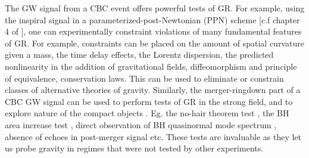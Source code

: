 The GW signal from a CBC event offers powerful tests of GR. For example, using the inspiral signal in a parameterized-post-Newtonian (PPN) scheme [c.f chapter 4 of \cite{CliffWills_book}], one can experimentally constraint violations of many fundamental features of GR. For example, constraints can be placed on the amount of spatial curvature given a mass, the time delay effects, the Lorentz dispersion, the predicted nonlinearity in the addition of gravitational fields, diffeomorphism and principle of equivalence, conservation laws. This can be used to eliminate or constrain classes of alternative theories of gravity. Similarly, the merger-ringdown part of a CBC GW signal can be used to perform tests of GR in the strong field, and to explore nature of the compact objects \cite{Mazur:2000pn,misner1973gravitation,Dreyer,Gossan,Kamaretsos}. Eg. the no-hair theorem test \cite{no-hair1,no-hair2}, the BH area increase test \cite{AreaIncreaseTheory1,AreaIncreaseTheory2}, direct observation of BH quasinormal mode spectrum \cite{lrr-1999-2,QNM-theory1 }, absence of echoes in post-merger signal \cite{echo1,echo2} etc. These tests are invaluable as they let us probe gravity in regimes that were not tested by other experiments. 



